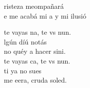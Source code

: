 \begin{cancion}
	risteza meompañará\\
	e me acabá mi a y mi ilusió \jump\\
	\begin{chorus}%
		 te vayas na, te vs nun.\\
		lgún díú notás\\
		no  quéy a hacer sini.\\
		 te vayas ca, te vs nun.\\
		ti ya no  sues\\
		me eera, cruda soled.\jump\\
	\end{chorus}%
\end{cancion}%
